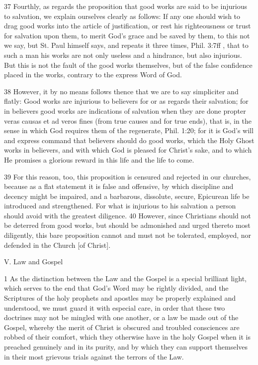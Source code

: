 37 Fourthly, as regards the proposition that good works are said to be injurious to salvation, we explain ourselves clearly as follows: If any one should wish to drag good works into the article of justification, or rest his righteousness or trust for salvation upon them, to merit God’s grace and be saved by them, to this not we say, but St. Paul himself says, and repeats it three times, Phil. 3:7ff , that to such a man his works are not only useless and a hindrance, but also injurious. But this is not the fault of the good works themselves, but of the false confidence placed in the works, contrary to the express Word of God.

38 However, it by no means follows thence that we are to say simpliciter and flatly: Good works are injurious to believers for or as regards their salvation; for in believers good works are indications of salvation when they are done propter veras causas et ad veros fines (from true causes and for true ends), that is, in the sense in which God requires them of the regenerate, Phil. 1:20; for it is God’s will and express command that believers should do good works, which the Holy Ghost works in believers, and with which God is pleased for Christ’s sake, and to which He promises a glorious reward in this life and the life to come.

39 For this reason, too, this proposition is censured and rejected in our churches, because as a flat statement it is false and offensive, by which discipline and decency might be impaired, and a barbarous, dissolute, secure, Epicurean life be introduced and strengthened. For what is injurious to his salvation a person should avoid with the greatest diligence.
40 However, since Christians should not be deterred from good works, but should be admonished and urged thereto most diligently, this bare proposition cannot and must not be tolerated, employed, nor defended in the Church [of Christ].

V. Law and Gospel

1 As the distinction between the Law and the Gospel is a special brilliant light, which serves to the end that God’s Word may be rightly divided, and the Scriptures of the holy prophets and apostles may be properly explained and understood, we must guard it with especial care, in order that these two doctrines may not be mingled with one another, or a law be made out of the Gospel, whereby the merit of Christ is obscured and troubled consciences are robbed of their comfort, which they otherwise have in the holy Gospel when it is preached genuinely and in its purity, and by which they can support themselves in their most grievous trials against the terrors of the Law.

